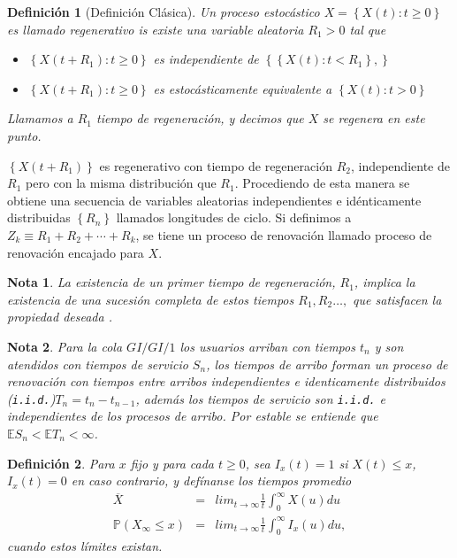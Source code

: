 \documentclass{article}
\newtheorem{Def}{Definición}[section]
\newtheorem{Note}{Nota}[section]
\newcommand{\esp}{\mathbb{E}}
\newcommand{\prob}{\mathbb{P}}
\numberwithin{equation}{section}
\begin{document}
\begin{Def}[Definici\'on Cl\'asica]
Un proceso estoc\'astico $X=\left\{X\left(t\right):t\geq0\right\}$ es llamado regenerativo is existe una variable aleatoria $R_{1}>0$ tal que
\begin{itemize}
\item[i)] $\left\{X\left(t+R_{1}\right):t\geq0\right\}$ es independiente de $\left\{\left\{X\left(t\right):t<R_{1}\right\},\right\}$
\item[ii)] $\left\{X\left(t+R_{1}\right):t\geq0\right\}$ es estoc\'asticamente equivalente a $\left\{X\left(t\right):t>0\right\}$
\end{itemize}

Llamamos a $R_{1}$ tiempo de regeneraci\'on, y decimos que $X$ se regenera en este punto.
\end{Def}

$\left\{X\left(t+R_{1}\right)\right\}$ es regenerativo con tiempo de regeneraci\'on $R_{2}$, independiente de $R_{1}$ pero con la misma distribuci\'on que $R_{1}$. Procediendo de esta manera se obtiene una secuencia de variables aleatorias independientes e id\'enticamente distribuidas $\left\{R_{n}\right\}$ llamados longitudes de ciclo. Si definimos a $Z_{k}\equiv R_{1}+R_{2}+\cdots+R_{k}$, se tiene un proceso de renovaci\'on llamado proceso de renovaci\'on encajado para $X$.


\begin{Note}
La existencia de un primer tiempo de regeneraci\'on, $R_{1}$, implica la existencia de una sucesi\'on completa de estos tiempos $R_{1},R_{2}\ldots,$ que satisfacen la propiedad deseada \cite{Sigman2}.
\end{Note}


\begin{Note} Para la cola $GI/GI/1$ los usuarios arriban con tiempos $t_{n}$ y son atendidos con tiempos de servicio $S_{n}$, los tiempos de arribo forman un proceso de renovaci\'on  con tiempos entre arribos independientes e identicamente distribuidos (\texttt{i.i.d.})$T_{n}=t_{n}-t_{n-1}$, adem\'as los tiempos de servicio son \texttt{i.i.d.} e independientes de los procesos de arribo. Por \textit{estable} se entiende que $\esp S_{n}<\esp T_{n}<\infty$.
\end{Note}
 


\begin{Def}
Para $x$ fijo y para cada $t\geq0$, sea $I_{x}\left(t\right)=1$ si $X\left(t\right)\leq x$,  $I_{x}\left(t\right)=0$ en caso contrario, y def\'inanse los tiempos promedio
\begin{eqnarray*}
\overline{X}&=&lim_{t\rightarrow\infty}\frac{1}{t}\int_{0}^{\infty}X\left(u\right)du\\
\prob\left(X_{\infty}\leq x\right)&=&lim_{t\rightarrow\infty}\frac{1}{t}\int_{0}^{\infty}I_{x}\left(u\right)du,
\end{eqnarray*}
cuando estos l\'imites existan.
\end{Def}
\end{document}
